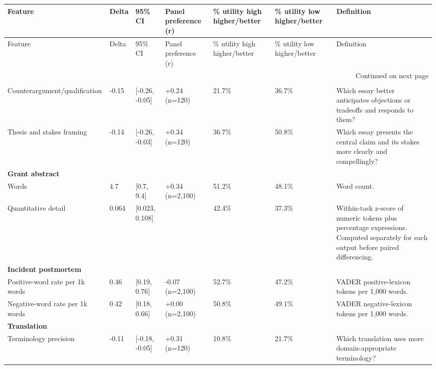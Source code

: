 \begin{longtable}{lllllll}
\toprule
Feature & Delta & 95\% CI & Panel preference (r) & \% utility high higher/better & \% utility low higher/better & Definition \\
\midrule
\endfirsthead
\toprule
Feature & Delta & 95\% CI & Panel preference (r) & \% utility high higher/better & \% utility low higher/better & Definition \\
\midrule
\endhead
\midrule
\multicolumn{7}{r}{Continued on next page} \\
\midrule
\endfoot
\bottomrule
\endlastfoot
\multicolumn{7}{l}{\textbf{Essay writing}} \\
Counterargument/qualification & -0.15 & [-0.26, -0.05] & +0.24 (n=120) & 21.7\% & 36.7\% & Which essay better anticipates objections or tradeoffs and responds to them? \\
Thesis and stakes framing & -0.14 & [-0.26, -0.03] & +0.34 (n=120) & 36.7\% & 50.8\% & Which essay presents the central claim and its stakes more clearly and compellingly? \\
\multicolumn{7}{l}{\textbf{Grant abstract}} \\
Words & 4.7 & [0.7, 9.4] & +0.34 (n=2,100) & 51.2\% & 48.1\% & Word count. \\
Quantitative detail & 0.064 & [0.023, 0.108] &  & 42.4\% & 37.3\% & Within-task z-score of numeric tokens plus percentage expressions. Computed separately for each output before paired differencing. \\
\multicolumn{7}{l}{\textbf{Incident postmortem}} \\
Positive-word rate per 1k words & 0.46 & [0.19, 0.76] & -0.07 (n=2,100) & 52.7\% & 47.2\% & VADER positive-lexicon tokens per 1,000 words. \\
Negative-word rate per 1k words & 0.42 & [0.18, 0.66] & +0.00 (n=2,100) & 50.8\% & 49.1\% & VADER negative-lexicon tokens per 1,000 words. \\
\multicolumn{7}{l}{\textbf{Translation}} \\
Terminology precision & -0.11 & [-0.18, -0.05] & +0.31 (n=120) & 10.8\% & 21.7\% & Which translation uses more domain-appropriate terminology? \\
\end{longtable}
